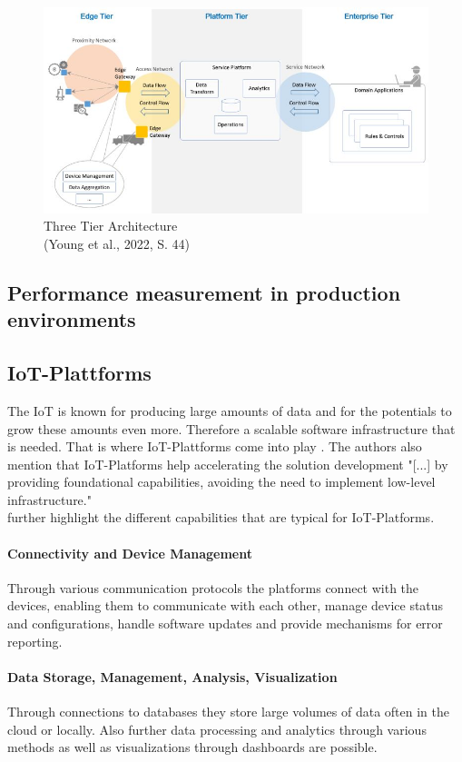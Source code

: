 \begin{figure}[H]
	\includegraphics[width=\linewidth]{pic/three-tier-architecture.jpg}
	\caption{Three Tier Architecture \\ (Young et al., 2022, S. 44)}
	\label{fig:Three-Tier-Architecture}
\end{figure}
\subsection{Performance measurement in production environments}

\subsection{IoT-Plattforms}
The IoT is known for producing large amounts of data and for the potentials to grow these amounts even more. Therefore a scalable software infrastructure that is needed. That is where IoT-Plattforms come into play \cite{turkiEvaluatingOpenSource2024}. The authors also mention that IoT-Platforms help accelerating the solution development "[...] by providing foundational capabilities, avoiding the need to implement low-level infrastructure."
\\\cite{asemaniUnderstandingIoTPlatforms2019} further highlight the different capabilities that are typical for IoT-Platforms.
\paragraph{Connectivity and Device Management}
Through various communication protocols the platforms connect with the devices, enabling them to communicate with each other, manage device status and configurations, handle software updates and provide mechanisms for error reporting.
\paragraph{Data Storage, Management, Analysis, Visualization}
Through connections to databases they store large volumes of data often in the cloud or locally. Also further data processing and analytics through various methods as well as visualizations through dashboards are possible.
